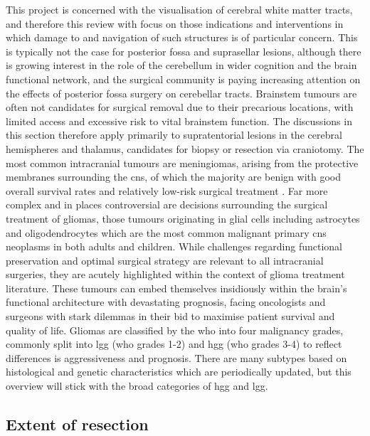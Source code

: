 This project is concerned with the visualisation of cerebral white matter tracts, and therefore this review with focus on those indications and interventions in which damage to and navigation of such structures is of particular concern.
This is typically not the case for posterior fossa and suprasellar lesions, although there is growing interest in the role of the cerebellum in wider cognition and the brain functional network, and the surgical community is paying increasing attention on the effects of posterior fossa surgery on cerebellar tracts\autocite{Toescu2021,Skye2023}.
Brainstem tumours are often not candidates for surgical removal due to their precarious locations, with limited access and excessive risk to vital brainstem function.
The discussions in this section therefore apply primarily to supratentorial lesions in the cerebral hemispheres and thalamus, candidates for biopsy or resection via craniotomy.
The most common intracranial tumours are meningiomas, arising from the protective membranes surrounding the \gls{cns}, of which the majority are benign with good overall survival rates and relatively low-risk surgical treatment \autocite{Rogers2015,Spena2022}.
Far more complex and in places controversial are decisions surrounding the surgical treatment of gliomas, those tumours originating in glial cells including astrocytes and oligodendrocytes which are the most common malignant primary \gls{cns} neoplasms in both adults\autocite{Ostrom2015,Wanis2021} and children\autocite{Ostrom2015,Bauchet2009}.
While challenges regarding functional preservation and optimal surgical strategy are relevant to all intracranial surgeries, they are acutely highlighted within the context of glioma treatment literature.
These tumours can embed themselves insidiously within the brain's functional architecture with devastating prognosis, facing oncologists and surgeons with stark dilemmas in their bid to maximise patient survival and quality of life.
Gliomas are classified by the \gls{who} into four malignancy grades, commonly split into \gls{lgg} (\gls{who} grades 1-2) and \gls{hgg} (\gls{who} grades 3-4) to reflect differences is aggressiveness and prognosis.
There are many subtypes based on histological and genetic characteristics which are periodically updated\autocite{Louis2021}, but this overview will stick with the broad categories of \gls{hgg} and \gls{lgg}.

\subsection{Extent of resection}

